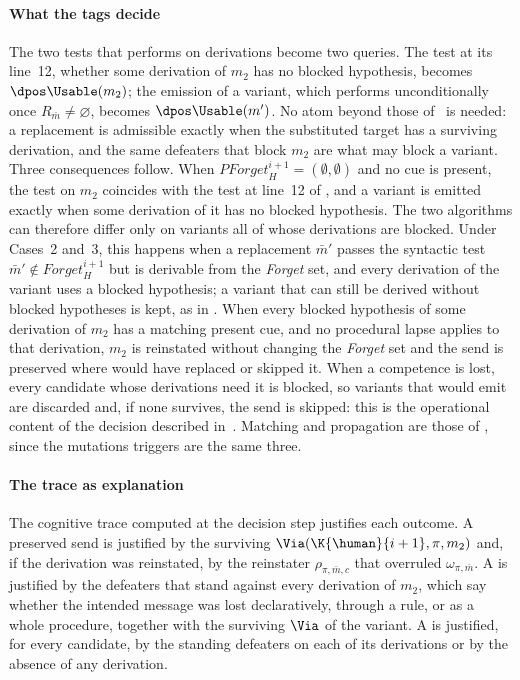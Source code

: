 \paragraph{What the tags decide}
The two tests that  performs on derivations become two queries. The test at its line~12, whether some derivation of $m_2$ has no blocked hypothesis, becomes $\dpos\Usable(m_2)$; the emission of a variant, which  performs unconditionally once $R_{\bar{m}} \neq \varnothing$, becomes $\dpos\Usable(m')$. No atom beyond those of~ is needed: a replacement is admissible exactly when the substituted target has a surviving derivation, and the same defeaters that block $m_2$ are what may block a variant. Three consequences follow. When $\mathit{PForget}^{i+1}_H=(\emptyset,\emptyset)$ and no cue is present, the test on $m_2$ coincides with the test at line~12 of , and a variant is emitted exactly when some derivation of it has no blocked hypothesis. The two algorithms can therefore differ only on variants all of whose derivations are blocked. Under Cases~2 and~3, this happens when a replacement $\bar m'$ passes the syntactic test $\bar m'\notin\mathit{Forget}^{i+1}_H$ but is derivable from the \emph{Forget} set, and every derivation of the variant uses a blocked hypothesis; a variant that can still be derived without blocked hypotheses is kept, as in . When every blocked hypothesis of some derivation of $m_2$ has a matching present cue, and no procedural lapse applies to that derivation, $m_2$ is reinstated without changing the \emph{Forget} set and the send is preserved where  would have replaced or skipped it. When a competence is lost, every candidate whose derivations need it is blocked, so variants that  would emit are discarded and, if none survives, the send is skipped: this is the operational content of the decision described in~. Matching and propagation are those of , since the mutations  triggers are the same three.

\paragraph{The trace as explanation}
The cognitive trace computed at the decision step justifies each outcome. A preserved send is justified by the surviving $\Via(\K{\human}{i+1},\pi,m_2)$ and, if the derivation was reinstated, by the reinstater $\rho_{\pi,\bar{m},c}$ that overruled $\omega_{\pi,\bar{m}}$. A \replace{} is justified by the defeaters that stand against every derivation of $m_2$, which say whether the intended message was lost declaratively, through a rule, or as a whole procedure, together with the surviving $\Via$ of the variant. A \skipmutation{} is justified, for every candidate, by the standing defeaters on each of its derivations or by the absence of any derivation.

